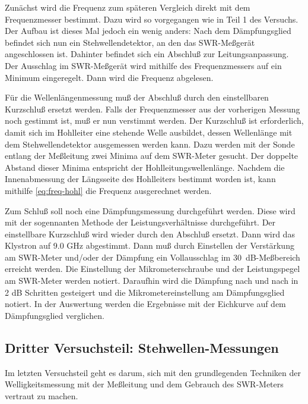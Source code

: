 Zunächst wird die Frequenz zum späteren Vergleich direkt mit dem
Frequenzmesser bestimmt.  Dazu wird so vorgegangen wie in Teil 1 des
Versuchs.  Der Aufbau ist dieses Mal jedoch ein wenig anders: Nach dem
Dämpfungsglied befindet sich nun ein Stehwellendetektor, an den das
SWR-Meßgerät angeschlossen ist.  Dahinter befindet sich ein Abschluß zur
Leitungsanpassung.  Der Ausschlag im SWR-Meßgerät wird mithilfe des
Frequenzmessers auf ein Minimum eingeregelt.  Dann wird die Frequenz
abgelesen.

Für die Wellenlängenmessung muß der Abschluß durch den einstellbaren
Kurzschluß ersetzt werden.  Falls der Frequenzmesser aus der vorherigen
Messung noch gestimmt ist, muß er nun verstimmt werden.  Der Kurzschluß
ist erforderlich, damit sich im Hohlleiter eine stehende Welle
ausbildet, dessen Wellenlänge mit dem Stehwellendetektor ausgemessen
werden kann.  Dazu werden mit der Sonde entlang der Meßleitung zwei Minima
auf dem SWR-Meter gesucht.  Der doppelte Abstand dieser Minima
entspricht der Hohlleitungswellenlänge.  Nachdem die Innenabmessung der
Längsseite des Hohlleiters bestimmt worden ist, kann mithilfe
\cref{eq:freq-hohl} die Frequenz ausgerechnet werden.

Zum Schluß soll noch eine Dämpfungsmessung durchgeführt werden.  Diese
wird mit der sogennanten Methode der Leistungsverhältnisse
durchgeführt. Der einstellbare Kurzschluß wird wieder durch den Abschluß
ersetzt.  Dann wird das Klystron auf 9.0 GHz abgestimmt.  Dann muß durch
Einstellen der Verstärkung am SWR-Meter und/oder der Dämpfung ein
Vollausschlag im \SI{30}{dB}-Meßbereich erreicht werden.  Die
Einstellung der Mikrometerschraube und der Leistungspegel am SWR-Meter
werden notiert.  Daraufhin wird die Dämpfung nach und nach in 2 dB
Schritten gesteigert und die Mikrometereinstellung am Dämpfungsglied
notiert.  In der Auswertung werden die Ergebnisse mit der Eichkurve auf
dem Dämpfungsglied verglichen.

\subsection{%
  Dritter Versuchsteil: Stehwellen-Messungen}

Im letzten Versuchsteil geht es darum, sich mit den grundlegenden
Techniken der Welligkeitsmessung mit der Meßleitung und dem Gebrauch des
SWR-Meters vertraut zu machen.

